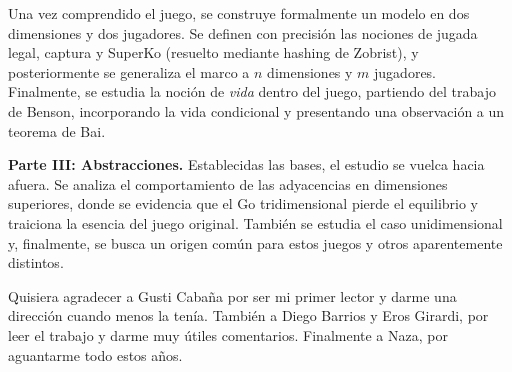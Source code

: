 Una vez comprendido el juego, se construye formalmente un modelo en dos dimensiones y dos jugadores. Se definen con precisión las nociones de jugada legal, captura y SuperKo (resuelto mediante hashing de Zobrist), y posteriormente se generaliza el marco a $n$ dimensiones y $m$ jugadores. Finalmente, se estudia la noción de \textit{vida} dentro del juego, partiendo del trabajo de Benson, incorporando la vida condicional y presentando una observación a un teorema de Bai.

\textbf{Parte III: Abstracciones.} Establecidas las bases, el estudio se vuelca hacia afuera. Se analiza el comportamiento de las adyacencias en dimensiones superiores, donde se evidencia que el Go tridimensional pierde el equilibrio y traiciona la esencia del juego original. También se estudia el caso unidimensional y, finalmente, se busca un origen común para estos juegos y otros aparentemente distintos.

\vfill

Quisiera agradecer a Gusti Cabaña por ser mi primer lector y darme una dirección cuando menos la tenía. También a Diego Barrios y Eros Girardi, por leer el trabajo y darme muy útiles comentarios. Finalmente a Naza, por aguantarme todo estos años.
\clearpage

\tableofcontents
\thispagestyle{empty}
\clearpage